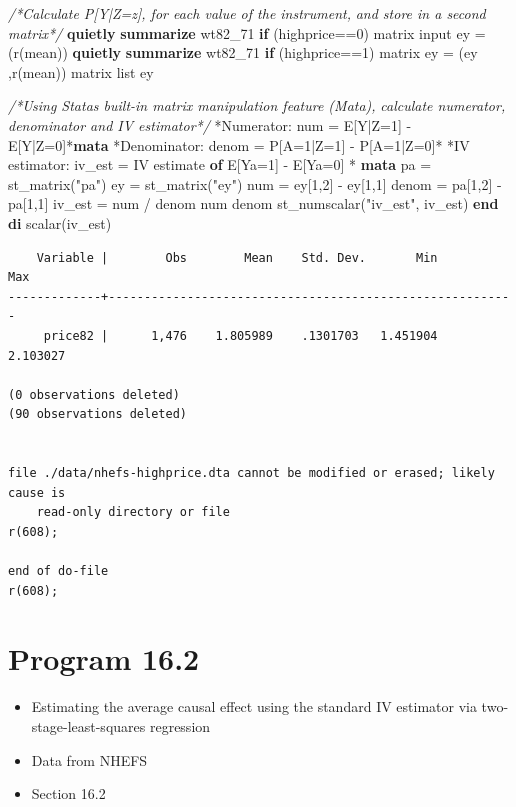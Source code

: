 \documentclass[
  10pt,
]{book}
\newenvironment{Shaded}{\begin{snugshade}}{\end{snugshade}}
\newcommand{\CommentTok}[1]{\textcolor[rgb]{0.56,0.35,0.01}{\textit{#1}}}
\newcommand{\FunctionTok}[1]{\textcolor[rgb]{0.00,0.00,0.00}{#1}}
\newcommand{\KeywordTok}[1]{\textcolor[rgb]{0.13,0.29,0.53}{\textbf{#1}}}
\newcommand{\NormalTok}[1]{#1}
\newcommand{\OtherTok}[1]{\textcolor[rgb]{0.56,0.35,0.01}{#1}}
\newcommand{\StringTok}[1]{\textcolor[rgb]{0.31,0.60,0.02}{#1}}
\providecommand{\tightlist}{%
  \setlength{\itemsep}{0pt}\setlength{\parskip}{0pt}}
\begin{document}
\begin{Shaded}
\begin{Highlighting}[]
\CommentTok{/*Calculate P[Y|Z=z], for each value of the instrument, }
\CommentTok{and store in a second matrix*/}
\KeywordTok{quietly} \KeywordTok{summarize}\NormalTok{ wt82\_71 }\KeywordTok{if}\NormalTok{ (highprice==0)}
\FunctionTok{matrix}\NormalTok{ input ey = (}\OtherTok{\textasciigrave{}r(mean)\textquotesingle{}}\NormalTok{)}
\KeywordTok{quietly} \KeywordTok{summarize}\NormalTok{ wt82\_71 }\KeywordTok{if}\NormalTok{ (highprice==1)}
\FunctionTok{matrix}\NormalTok{ ey = (ey ,}\OtherTok{\textasciigrave{}r(mean)\textquotesingle{}}\NormalTok{)}
\FunctionTok{matrix} \OtherTok{list}\NormalTok{ ey}

\CommentTok{/*Using Stata\textquotesingle{}s built{-}in matrix manipulation feature (Mata), }
\CommentTok{calculate numerator, denominator and IV estimator*/}
\NormalTok{*Numerator: num = E[Y|Z=1] {-} E[Y|Z=0]*}\KeywordTok{mata}
\NormalTok{*Denominator: denom = P[A=1|Z=1] {-} P[A=1|Z=0]*}
\NormalTok{*IV estimator: iv\_est = IV estimate }\KeywordTok{of}\NormalTok{ E[Ya=1] {-} E[Ya=0] *}
\KeywordTok{mata} 
\NormalTok{pa = st\_matrix(}\StringTok{"pa"}\NormalTok{)}
\NormalTok{ey = st\_matrix(}\StringTok{"ey"}\NormalTok{)}
\NormalTok{num = ey[1,2] {-} ey[1,1] }
\NormalTok{denom = pa[1,2] {-} pa[1,1]}
\NormalTok{iv\_est = num / denom }
\NormalTok{num}
\NormalTok{denom}
\NormalTok{st\_numscalar(}\StringTok{"iv\_est"}\NormalTok{, iv\_est)}
\KeywordTok{end}
\KeywordTok{di} \FunctionTok{scalar}\NormalTok{(iv\_est)}
\end{Highlighting}
\end{Shaded}

\begin{verbatim}
    Variable |        Obs        Mean    Std. Dev.       Min        Max
-------------+---------------------------------------------------------
     price82 |      1,476    1.805989    .1301703   1.451904   2.103027

(0 observations deleted)
(90 observations deleted)


file ./data/nhefs-highprice.dta cannot be modified or erased; likely cause is
    read-only directory or file
r(608);

end of do-file
r(608);
\end{verbatim}

\hypertarget{program-16.2-1}{%
\section{Program 16.2}\label{program-16.2-1}}

\begin{itemize}
\tightlist
\item
  Estimating the average causal effect using the standard IV estimator via two-stage-least-squares regression
\item
  Data from NHEFS
\item
  Section 16.2
\end{itemize}
\end{document}
